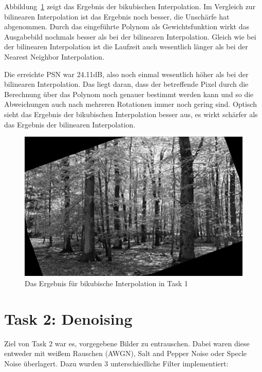 \smallskip

Abbildung~\ref{fig:t1_bc} zeigt das Ergebnis der bikubischen Interpolation. Im Vergleich zur bilinearen Interpolation ist das Ergebnis noch besser, die Unschärfe hat abgenommen. Durch das eingeführte Polynom als Gewichtsfunktion wirkt das Ausgabebild nochmals besser als bei der bilinearen Interpolation. Gleich wie bei der bilinearen Interpolation ist die Laufzeit auch wesentlich länger als bei der Nearest Neighbor Interpolation.

Die erreichte PSN war 24.11dB, also noch einmal wesentlich höher als bei der bilinearen Interpolation. Das liegt daran, dass der betreffende Pixel durch die Berechnung über das Polynom noch genauer bestimmt werden kann und so die Abweichungen auch nach mehreren Rotationen immer noch gering sind. Optisch sieht das Ergebnis der bikubischen Interpolation besser aus, es wirkt schärfer als das Ergebnis der bilinearen Interpolation.

\begin{figure}[htb]
 \centering
 \includegraphics{./img/t1_bc.png}
 \caption{Das Ergebnis für bikubische Interpolation in Task 1}
 \label{fig:t1_bc}
\end{figure}

\clearpage



\chapter{Task 2: Denoising}

Ziel von Task 2 war es, vorgegebene Bilder zu entrauschen. Dabei waren diese entweder mit weißem Rauschen (AWGN), Salt and Pepper Noise oder Specle Noise überlagert. Dazu wurden 3 unterschiedliche Filter implementiert:

